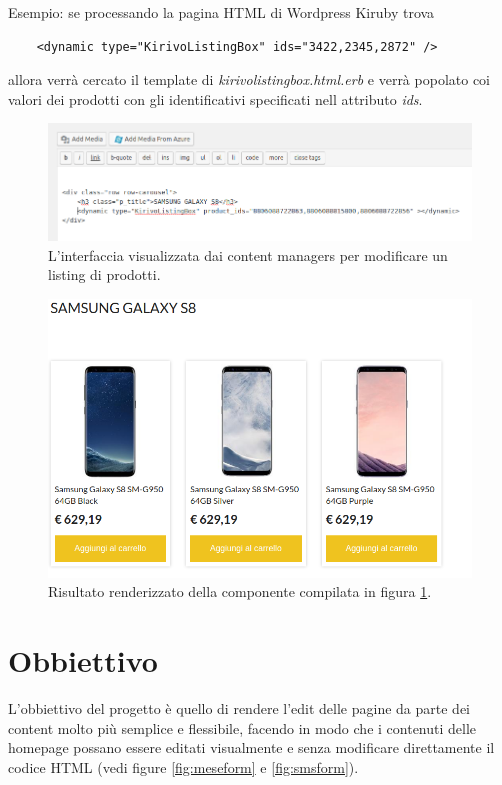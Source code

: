 Esempio: se processando la pagina HTML di Wordpress Kiruby trova
\begin{verbatim}
	<dynamic type="KirivoListingBox" ids="3422,2345,2872" />
\end{verbatim}
allora verrà cercato il template di \emph{kirivolistingbox.html.erb} e verrà popolato
coi valori dei prodotti con gli identificativi specificati nell attributo \emph{ids}.


\begin{figure}
  \includegraphics[width=\textwidth]{figure/sms-html.png}
  \caption{L'interfaccia visualizzata dai content managers per modificare un listing di prodotti.}
  \label{fig:smshtml}
\end{figure}

\begin{figure}
  \includegraphics[width=\textwidth]{figure/sms-render.png}
  \caption{Risultato renderizzato della componente compilata in figura \ref{fig:smshtml}.}
  \label{fig:smsrender}
\end{figure}


\newpage

\section{Obbiettivo}
L'obbiettivo del progetto è quello di rendere l'edit delle pagine
da parte dei content molto più semplice e flessibile,
facendo in modo che i contenuti delle homepage possano essere editati visualmente e senza
modificare direttamente il codice HTML (vedi figure \ref{fig:meseform} e \ref{fig:smsform}).

